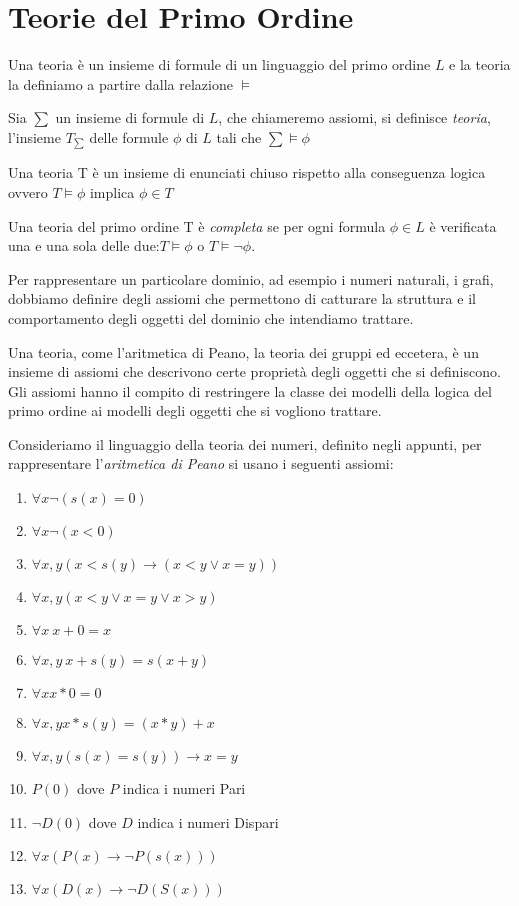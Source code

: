 \section{Teorie del Primo Ordine}
Una teoria è un insieme di formule di un linguaggio del primo ordine $L$ e la teoria
la definiamo a partire dalla relazione $\models$

\begin{defi}
    Sia $\sum$ un insieme di formule di $L$, che chiameremo assiomi, si definisce
\emph{teoria}, l'insieme $T_ {\sum}$ delle formule $\phi$ di $L$ tali che $\sum \models \phi$
\end{defi}

\begin{defi}
    Una teoria T è un insieme di enunciati chiuso rispetto alla conseguenza logica
    ovvero $T \models \phi$ implica $\phi \in T$
\end{defi}

\begin{defi}
    Una teoria del primo ordine T è \emph{completa} se per ogni formula $\phi \in L$
è verificata una e una sola delle due:$T \models \phi$ o $T \models \neg \phi$.
\end{defi}

Per rappresentare un particolare dominio, ad esempio i numeri naturali, i grafi,
dobbiamo definire degli assiomi che permettono di catturare la struttura e il comportamento
degli oggetti del dominio che intendiamo trattare.

Una teoria, come l'aritmetica di Peano, la teoria dei gruppi ed eccetera, è un insieme
di assiomi che descrivono certe proprietà degli oggetti che si definiscono.\newline
Gli assiomi hanno il compito di restringere la classe dei modelli della logica
del primo ordine ai modelli degli oggetti che si vogliono trattare.

Consideriamo il linguaggio della teoria dei numeri, definito negli appunti, per
rappresentare l'\emph{aritmetica di Peano} si usano i seguenti assiomi:
\begin{enumerate}
    \item $\forall x \neg (s(x) = 0)$
    \item $\forall x \neg(x < 0)$
    \item $\forall x,y (x < s(y) \rightarrow (x < y \lor x = y))$
    \item $\forall x,y (x < y \lor x = y \lor x > y)$
    \item $\forall x \ x + 0 = x$
    \item $\forall x,y \ x + s(y) = s(x+y)$
    \item $\forall x x * 0 = 0$
    \item $\forall x,y x * s(y) = (x * y) + x$
    \item $\forall x,y (s(x) = s(y)) \rightarrow x = y$
    \item $P(0)$ dove $P$ indica i numeri Pari
    \item $\neg D(0)$ dove $D$ indica i numeri Dispari
    \item $\forall x (P(x) \rightarrow \neg P(s(x)))$
    \item $\forall x (D(x) \rightarrow \neg D(S(x)))$
\end{enumerate}
